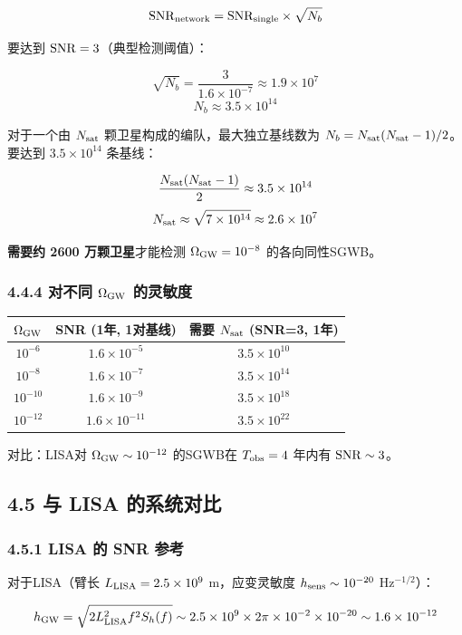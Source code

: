 \documentclass[12pt,a4paper]{article}
\begin{document}
$${\rm SNR}_{\rm network} = {\rm SNR}_{\rm single} \times \sqrt{N_b}$$

要达到 ${\rm SNR} = 3$（典型检测阈值）：

$$\sqrt{N_b} = \frac{3}{1.6 \times 10^{-7}} \approx 1.9 \times 10^7$$
$$N_b \approx 3.5 \times 10^{14}$$

对于一个由 $N_{\rm sat}$ 颗卫星构成的编队，最大独立基线数为 $N_b = N_{\rm sat}(N_{\rm sat}-1)/2$。要达到 $3.5 \times 10^{14}$ 条基线：

$$\frac{N_{\rm sat}(N_{\rm sat}-1)}{2} \approx 3.5 \times 10^{14}$$
$$N_{\rm sat} \approx \sqrt{7 \times 10^{14}} \approx 2.6 \times 10^7$$

\textbf{需要约 2600 万颗卫星}才能检测 $\Omega_{\rm GW} = 10^{-8}$ 的各向同性SGWB。

\subsubsection{4.4.4 对不同 $\Omega_{\rm GW}$ 的灵敏度}


\begin{tabular}{|c|c|c|}
\hline
$\Omega_{\rm GW}$ & SNR (1年, 1对基线) & 需要 $N_{\rm sat}$ (SNR=3, 1年) \\
\hline
$10^{-6}$ & $1.6 \times 10^{-5}$ & $3.5 \times 10^{10}$ \\
$10^{-8}$ & $1.6 \times 10^{-7}$ & $3.5 \times 10^{14}$ \\
$10^{-10}$ & $1.6 \times 10^{-9}$ & $3.5 \times 10^{18}$ \\
$10^{-12}$ & $1.6 \times 10^{-11}$ & $3.5 \times 10^{22}$ \\
\hline
\end{tabular}


对比：LISA对 $\Omega_{\rm GW} \sim 10^{-12}$ 的SGWB在 $T_{\rm obs} = 4$ 年内有 ${\rm SNR} \sim 3$。

\subsection{4.5 与 LISA 的系统对比}


\subsubsection{4.5.1 LISA 的 SNR 参考}


对于LISA（臂长 $L_{\rm LISA} = 2.5 \times 10^9$ m，应变灵敏度 $h_{\rm sens} \sim 10^{-20}$ Hz$^{-1/2}$）：

$$h_{\rm GW} = \sqrt{2 L_{\rm LISA}^2 f^2 S_h(f)} \sim 2.5 \times 10^9 \times 2\pi \times 10^{-2} \times 10^{-20} \sim 1.6 \times 10^{-12}$$
\end{document}
